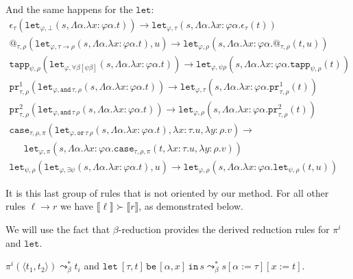 \documentclass[a4paper,UKenglish,cleveref,autoref,numberwithinsect]{lipics-v2019}
\theoremstyle{definition}
\newcommand{\arrtype}{\rightarrow}
\newcommand{\subst}[2]{#1:=#2}
\newcommand{\abs}[2]{\lambda #1.#2}
\newcommand{\tabs}[2]{\Lambda #1.#2}
\newcommand{\pair}[2]{\langle #1,#2 \rangle}
\newcommand{\expair}[2]{[#1,#2]}
\newcommand{\red}{\longrightarrow}
\newcommand{\interpret}[1]{\llbracket #1 \rrbracket}
\newcommand{\xlet}[4]{\mathtt{let}_{#1}\,#2\,\mathtt{be}\,[#3]\,\mathtt{in}\,#4}
\newcommand{\proj}{\mathtt{pr}}
\begin{document}
And the same happens for the $\mathtt{let}$:
\[
\begin{array}{l}
\epsilon_\tau(\mathtt{let}_{\varphi,\bot}(s,\tabs{\alpha}{
  \abs{x:\varphi\alpha}{t}})) \red
  \mathtt{let}_{\varphi,\tau}(s,\tabs{\alpha}{\abs{x:\varphi\alpha}{
  \epsilon_\tau(t)}}) \\
@_{\tau,\rho}(\mathtt{let}_{\varphi, \tau \arrtype
  \rho}(s,\tabs{\alpha}{\abs{x:\varphi\alpha}{t}}),u) \red
  \mathtt{let}_{\varphi,\rho}(s,\tabs{\alpha}{\abs{x:\varphi\alpha}{
  @_{\tau,\rho}(t,u)}}) \\
\mathtt{tapp}_{\psi,\rho}(\mathtt{let}_{\varphi,
  \forall\beta[\psi\beta]}(s,\tabs{\alpha}{\abs{x:\varphi\alpha}{t}}))
  \red
  \mathtt{let}_{\varphi,\psi\rho}(s,\tabs{\alpha}{\abs{x:\varphi\alpha}{
  \mathtt{tapp}_{\psi,\rho}(t)}}) \\
\proj^1_{\tau,\rho}(\mathtt{let}_{\varphi,
  \mathtt{and}\,\tau,\rho}(s,\tabs{\alpha}{\abs{x:\varphi\alpha}{t}}))
  \red
  \mathtt{let}_{\varphi,\tau}(s,\tabs{\alpha}{\abs{x:\varphi\alpha}{
  \proj^1_{\tau,\rho}(t)}}) \\
\proj^2_{\tau,\rho}(\mathtt{let}_{\varphi,
  \mathtt{and}\,\tau\,\rho}(s,\tabs{\alpha}{\abs{x:\varphi\alpha}{t}}))
  \red
  \mathtt{let}_{\varphi,\rho}(s,\tabs{\alpha}{\abs{x:\varphi\alpha}{
  \proj^2_{\tau,\rho}(t)}}) \\
\mathtt{case}_{\tau,\rho,\pi}(
  \mathtt{let}_{\varphi,\mathtt{or}\,\tau\,\rho}(s,\tabs{\alpha}{
  \abs{x:\varphi\alpha}{t}}),\abs{x:\tau}{u},\abs{y:\rho}{v})
  \red \\
\phantom{AB}
  \mathtt{let}_{\varphi,\pi}(s,\tabs{\alpha}{\abs{x:\varphi\alpha}{
  \mathtt{case}_{\tau,\rho,\pi}(t,\abs{x:\tau}{u},\abs{y:\rho}{v})}}) \\
\mathtt{let}_{\psi,\rho}(\mathtt{let}_{\varphi,\exists\psi}(s,
  \tabs{\alpha}{\abs{x:\varphi\alpha}{t}}),u) \red
  \mathtt{let}_{\varphi,\rho}(s,\tabs{\alpha}{\abs{x:\varphi\alpha}{
  \mathtt{let}_{\psi,\rho}(t,u)}})
  \phantom{ABCDEFGHIJ}
\end{array}
\]

It is this last group of rules that is not oriented by our method.
For all other rules $\ell \red r$ we have $\interpret{\ell} \succ
\interpret{r}$, as demonstrated below.

We will use the fact that $\beta$-reduction provides the derived
reduction rules for $\pi^i$ and $\mathtt{let}$.

\begin{lemma}\label{lem:encodings_reduce}
  $\pi^i(\pair{t_1}{t_2}) \leadsto_\beta^* t_i$ and
  $\xlet{}{\expair{\tau}{t}}{\alpha,x}{s} \leadsto_\beta^*
  s[\subst{\alpha}{\tau}][\subst{x}{t}]$.
\end{lemma}
\end{document}
